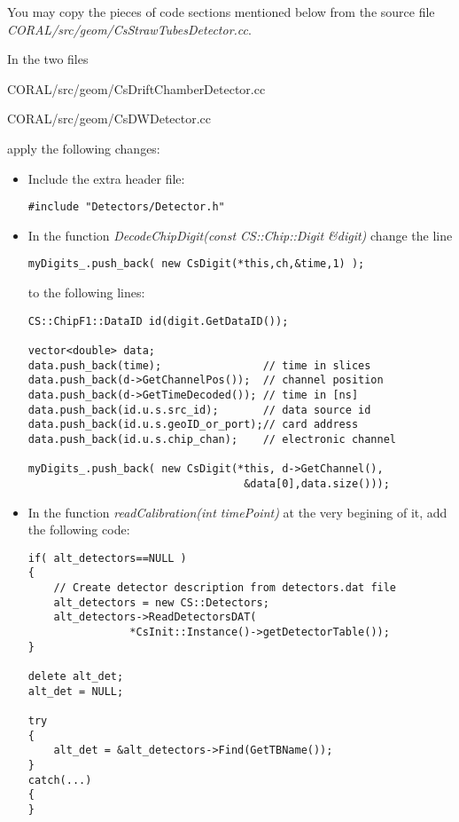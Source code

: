 \documentclass[a4paper,12pt]{article}
\begin{document}
\begin{enumerate}
You may copy the pieces of code sections mentioned below from
the source file \mbox{\it CORAL/src/geom/CsStrawTubesDetector.cc}.

In the two files
\begin{description}
\it
\item[] CORAL/src/geom/CsDriftChamberDetector.cc
\item[] CORAL/src/geom/CsDWDetector.cc
\end{description}
apply the following changes:
\begin{itemize}
\item Include the extra header file:
\begin{verbatim}
#include "Detectors/Detector.h"
\end{verbatim}
\item In the function {\it DecodeChipDigit(const CS::Chip::Digit \&digit)}
change the line
\begin{verbatim}
myDigits_.push_back( new CsDigit(*this,ch,&time,1) );
\end{verbatim}
to the following lines:
\begin{verbatim}
CS::ChipF1::DataID id(digit.GetDataID());

vector<double> data;
data.push_back(time);                // time in slices
data.push_back(d->GetChannelPos());  // channel position
data.push_back(d->GetTimeDecoded()); // time in [ns]
data.push_back(id.u.s.src_id);       // data source id
data.push_back(id.u.s.geoID_or_port);// card address
data.push_back(id.u.s.chip_chan);    // electronic channel

myDigits_.push_back( new CsDigit(*this, d->GetChannel(), 
                                  &data[0],data.size()));
\end{verbatim}

\item In the function {\it readCalibration(int timePoint)} at the very begining of it,
add the following code:
\begin{verbatim}
if( alt_detectors==NULL )
{
    // Create detector description from detectors.dat file
    alt_detectors = new CS::Detectors;
    alt_detectors->ReadDetectorsDAT(
                *CsInit::Instance()->getDetectorTable());
}

delete alt_det;
alt_det = NULL;

try
{
    alt_det = &alt_detectors->Find(GetTBName());
}
catch(...)
{
}
\end{verbatim}
\end{itemize}


\end{enumerate}
\end{document}
